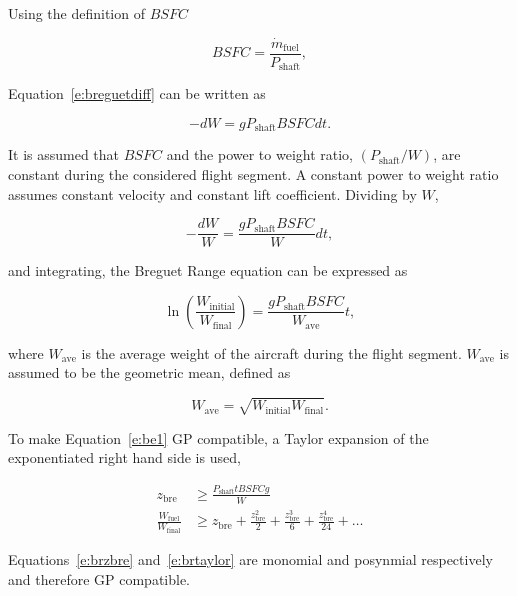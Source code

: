 \documentclass[]{aiaa-tc}%
\begin{document}
Using the definition of $BSFC$

\begin{equation}
    \label{e:brBSFC}
    BSFC = \frac{\dot{m}_{\text{fuel}}}{P_{\text{shaft}}},
\end{equation}

Equation~\eqref{e:breguetdiff} can be written as

\begin{equation}
    \label{e:brdiff2}
    -dW = g P_{\text{shaft}} BSFC dt.
\end{equation}

It is assumed that $BSFC$ and the power to weight ratio, $(P_{\text{shaft}}/W)$, are constant during the considered flight segment. 
A constant power to weight ratio assumes constant velocity and constant lift coefficient.\cite{br2}
Dividing by $W$,

\begin{equation}
    \label{e:brdiff2}
    -\frac{dW}{W} = \frac{g P_{\text{shaft}}BSFC }{W} dt,
\end{equation}

and integrating, the Breguet Range equation can be expressed as

\begin{equation}
    \label{e:be1}
    \ln{\left( \frac{W_{\text{initial}}}{W_{\text{final}}} \right)} = \frac{gP_{\text{shaft}}BSFC}{W_{\text{ave}}} t,
\end{equation}

where $W_{\text{ave}}$ is the average weight of the aircraft during the flight segment.  $W_{\text{ave}}$ is assumed to be the geometric mean, defined as

\begin{equation}
    \label{e:gpmean}
    W_{\text{ave}} = \sqrt{W_{\text{initial}}W_{\text{final}}}.
\end{equation}

    To make Equation~\eqref{e:be1} GP compatible, a Taylor expansion of the exponentiated right hand side is used,\cite{hoburgthesis}

\begin{align}
    \label{e:brzbre}
    z_{\text{bre}} &\geq \frac{P_{\text{shaft}}t BSFC g}{W}\\
    \label{e:brtaylor}
    \frac{W_{\text{fuel}}}{W_\text{final}} &\geq z_{\text{bre}} + \frac{z_{\text{bre}}^2}{2} + \frac{z_{\text{bre}}^3}{6} + \frac{z_{\text{bre}}^4}{24} + \dots
\end{align}

    Equations~\ref{e:brzbre} and~\ref{e:brtaylor} are monomial and posynmial respectively and therefore GP compatible. \\
    
\end{document}

